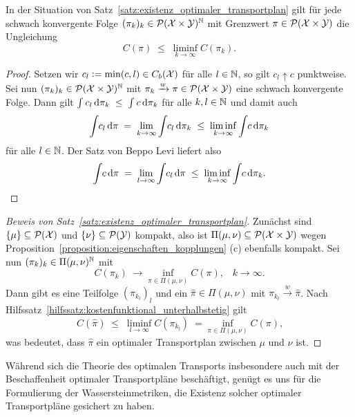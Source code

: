 \documentclass[../thesis/thesis.tex]{subfiles}
\begin{document}
	\begin{Hilfssatz}
		\label{hilfssatz:kostenfunktional_unterhalbstetig}
		In der Situation von Satz~\ref{satz:existenz_optimaler_transportplan} gilt für jede schwach konvergente Folge $(\pi_k)_k \in \mathcal{P}(\mathcal{X} \times \mathcal{Y})^{\mathbb{N}}$ mit Grenzwert $\pi \in \mathcal{P}(\mathcal{X} \times \mathcal{Y})$ die Ungleichung
		\[ C(\pi) \; \leq \; \liminf_{k \to \infty} C(\pi_k) \text{.} \]
	\end{Hilfssatz}

	\begin{proof}
		Setzen wir $c_l \vcentcolon = \min(c, l) \in C_b(\mathcal{X})$ für alle $l \in \mathbb{N}$, so gilt $c_l \uparrow c$ punktweise. Sei nun $(\pi_k)_k \in \mathcal{P}(\mathcal{X} \times \mathcal{Y})^{\mathbb{N}}$ mit $\pi_k \xrightarrow{w} \pi \in \mathcal{P}(\mathcal{X} \times \mathcal{Y})$ eine schwach konvergente Folge. Dann gilt
		$\int_{} \, c_l \, \mathrm{d}\pi_k \; \leq \; \int_{} \, c \, \mathrm{d}\pi_k$ für alle $k, l \in \mathbb{N}$ und damit auch 
		\[ \int_{} \, c_l \, \mathrm{d}\pi \; = \; \lim_{k \to \infty} \int_{} \, c_l \, \mathrm{d}\pi_k \; \leq \; \liminf_{k \to \infty} \int_{} \, c \, \mathrm{d}\pi_k \]
		für alle $l \in \mathbb{N}$. Der Satz von Beppo Levi liefert also
		\[ \int_{} \, c \, \mathrm{d}\pi \; = \; \lim_{l \to \infty} \int_{} \, c_l \, \mathrm{d}\pi \; \leq \; \liminf_{k \to \infty} \int_{} \, c \, \mathrm{d}\pi_k \text{.} \qedhere \]
	\end{proof}

	\begin{proof}[Beweis von Satz~\ref{satz:existenz_optimaler_transportplan}]
		Zunächst sind $\left\{\mu\right\} \subseteq \mathcal{P}(\mathcal{X})$ und $\left\{\nu\right\} \subseteq \mathcal{P}(\mathcal{Y})$ kompakt, also ist $\Pi(\mu, \nu) \subseteq \mathcal{P}(\mathcal{X} \times \mathcal{Y})$ 
		wegen Proposition~\ref{proposition:eigenschaften_kopplungen} (c) ebenfalls kompakt.
		Sei nun $(\pi_k)_k \in \Pi(\mu, \nu)^{\mathbb{N}}$ mit
		\[ C(\pi_k) \; \to \inf_{\pi \in \Pi(\mu, \nu)} C(\pi) \text{,} \quad k \to \infty \text{.} \]
		Dann gibt es eine Teilfolge $(\pi_{k_l})_l$ und ein $\hat{\pi} \in \Pi(\mu, \nu)$ mit $\pi_{k_l} \xrightarrow{w} \hat{\pi}$. Nach Hilfssatz~\ref{hilfssatz:kostenfunktional_unterhalbstetig} gilt
		\[ C(\hat{\pi}) \; \leq \; \liminf_{l \to \infty} C(\pi_{k_l}) \; = \inf_{\pi \in \Pi(\mu, \nu)} C(\pi) \text{,} \]
		was bedeutet, dass $\hat{\pi}$ ein optimaler Transportplan zwischen $\mu$ und $\nu$ ist. 
	\end{proof}

	Während sich die Theorie des optimalen Transports insbesondere auch mit der Beschaffenheit optimaler Transportpläne beschäftigt, genügt es uns für die Formulierung der Wassersteinmetriken, 
	die Existenz solcher optimaler Transportpläne gesichert zu haben.
\end{document}
